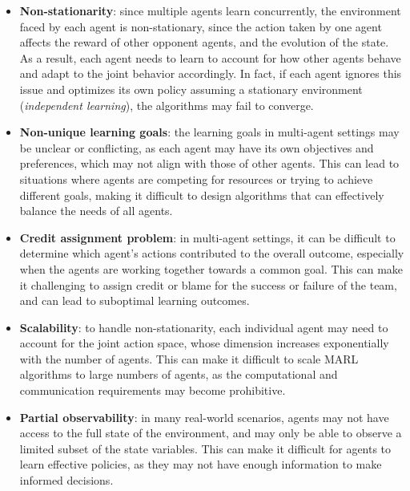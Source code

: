 \begin{itemize}
    \item \textbf{Non-stationarity}: since multiple agents learn concurrently, the environment faced by each agent is non-stationary, since the action taken by one agent affects the reward of other opponent agents, and the evolution of the state. As a result, each agent needs to learn to account for how other agents behave and adapt to the joint behavior accordingly. In fact, if each agent ignores this issue and optimizes its own policy assuming a stationary environment (\textit{independent learning}), the algorithms may fail to converge. 
    \item \textbf{Non-unique learning goals}: the learning goals in multi-agent settings may be unclear or conflicting, as each agent may have its own objectives and preferences, which may not align with those of other agents. This can lead to situations where agents are competing for resources or trying to achieve different goals, making it difficult to design algorithms that can effectively balance the needs of all agents.
    \item \textbf{Credit assignment problem}: in multi-agent settings, it can be difficult to determine which agent's actions contributed to the overall outcome, especially when the agents are working together towards a common goal. This can make it challenging to assign credit or blame for the success or failure of the team, and can lead to suboptimal learning outcomes.
    \item \textbf{Scalability}: to handle non-stationarity, each individual agent may need to account for the joint action space, whose dimension increases exponentially with the number of agents. This can make it difficult to scale MARL algorithms to large numbers of agents, as the computational and communication requirements may become prohibitive.
    \item \textbf{Partial observability}: in many real-world scenarios, agents may not have access to the full state of the environment, and may only be able to observe a limited subset of the state variables. This can make it difficult for agents to learn effective policies, as they may not have enough information to make informed decisions.
\end{itemize}